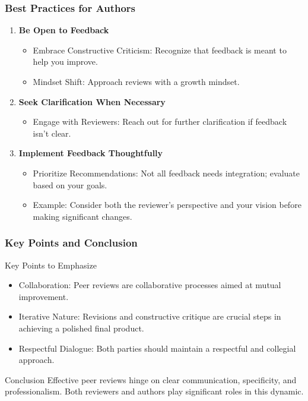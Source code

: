 \documentclass{beamer}
\begin{document}
\begin{frame}[fragile]
    \frametitle{Best Practices for Authors}
    \begin{enumerate}
        \item \textbf{Be Open to Feedback}
            \begin{itemize}
                \item Embrace Constructive Criticism: Recognize that feedback is meant to help you improve.
                \item Mindset Shift: Approach reviews with a growth mindset.
            \end{itemize}
        
        \item \textbf{Seek Clarification When Necessary}
            \begin{itemize}
                \item Engage with Reviewers: Reach out for further clarification if feedback isn’t clear.
            \end{itemize}
        
        \item \textbf{Implement Feedback Thoughtfully}
            \begin{itemize}
                \item Prioritize Recommendations: Not all feedback needs integration; evaluate based on your goals.
                \item Example: Consider both the reviewer's perspective and your vision before making significant changes.
            \end{itemize}
    \end{enumerate}
\end{frame}

\begin{frame}[fragile]
    \frametitle{Key Points and Conclusion}
    \begin{block}{Key Points to Emphasize}
        \begin{itemize}
            \item Collaboration: Peer reviews are collaborative processes aimed at mutual improvement.
            \item Iterative Nature: Revisions and constructive critique are crucial steps in achieving a polished final product.
            \item Respectful Dialogue: Both parties should maintain a respectful and collegial approach.
        \end{itemize}
    \end{block}

    \begin{block}{Conclusion}
        Effective peer reviews hinge on clear communication, specificity, and professionalism. Both reviewers and authors play significant roles in this dynamic.
    \end{block}
\end{frame}
\end{document}
